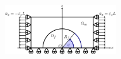 \documentclass[first,firstsupp,lastsupp,last,hyperref,table]{ETHclass}
\begin{document}
\begin{frame}
\begin{columns}[c]
\begin{column}{0.5\textwidth}
\begin{figure}
\end{figure}
\end{column}
\end{columns}
\vspace{-0.25cm}
\centering
\begin{figure}
\centering
\includegraphics[width=0.45\textwidth]{refAngle.pdf}
\end{figure}
\end{frame}

\addtocounter{framenumber}{-1}
\end{document}
